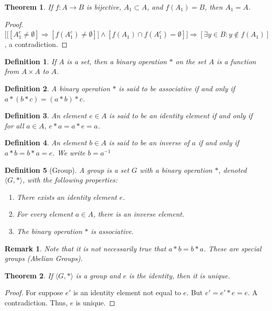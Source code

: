\documentclass[12pt,oneside]{book}
\theoremstyle{mystyle}
\newtheorem{theorem}{Theorem}[section]
\newtheorem{definition}{Definition}[section]
\newtheorem{remark}{Remark}[section]
\begin{document}
\begin{theorem}
If $f:A\rightarrow B$ is bijective, $A_1\subset A$, and $f(A_1) = B$, then $A_1=A$.
\end{theorem}
\begin{proof}
$\Big[\big[[A_1^c \ne \emptyset]\Rightarrow [f(A_1^c) \ne \emptyset]\big]\land[f(A_1)\cap f(A_1^c) = \emptyset]\Big]\Rightarrow [\exists y\in B:y\notin f(A_1)]$, a contradiction.
\end{proof}

\begin{definition}
If $A$ is a set, then a binary operation $*$ on the set $A$ is a function from $A\times A$ to $A$.
\end{definition}

\begin{definition}
A binary operation $*$ is said to be associative if and only if $a*(b*c) = (a*b)*c$.
\end{definition}

\begin{definition}
An element $e\in A$ is said to be an identity element if and only if for all $a\in A$, $e*a = a*e = a$.
\end{definition}

\begin{definition}
An element $b\in A$ is said to be an inverse of $a$ if and only if $a*b=b*a = e$. We write $b=a^{-1}$
\end{definition}

\begin{definition}[Group]
A group is a set $G$ with a binary operation $*$, denoted $\langle G,* \rangle$, with the following properties: 
\begin{enumerate}
\item There exists an identity element $e$.
\item For every element $a\in A$, there is an inverse element.
\item The binary operation $*$ is associative.
\end{enumerate}
\end{definition}

\begin{remark}
Note that it is not necessarily true that $a*b = b*a$. These are special groups (Abelian Groups).
\end{remark}

\begin{theorem}
If $\langle G, * \rangle$ is a group and $e$ is the identity, then it is unique.
\end{theorem}
\begin{proof}
For suppose $e'$ is an identity element not equal to $e$. But $e' = e'*e  = e$. A contradiction. Thus, $e$ is unique.
\end{proof}
\end{document}
